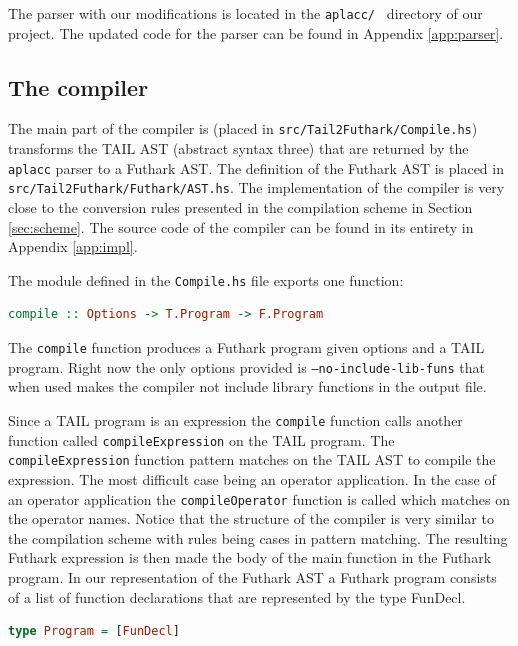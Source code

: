 \documentclass[11pt]{article}
\begin{document}
The parser with our modifications is located in the {\tt aplacc/ } directory of our project. 
The updated code for the parser can be found in Appendix \ref{app:parser}.

\subsection{The compiler}
The main part of the compiler is (placed in {\tt src/Tail2Futhark/Compile.hs}) transforms the TAIL AST (abstract syntax three) that are returned by the {\tt aplacc} parser to a Futhark AST.
The definition of the Futhark AST is placed in {\tt src/Tail2Futhark/Futhark/AST.hs}.
The implementation of the compiler is very close to the conversion rules presented in the compilation scheme in Section \ref{sec:scheme}. The source code of the compiler can be found in its entirety in Appendix \ref{app:impl}.

The module defined in the {\tt Compile.hs} file exports one function:
\begin{lstlisting}[language=haskell]
compile :: Options -> T.Program -> F.Program
\end{lstlisting}

The {\tt compile} function produces a Futhark program given options and a TAIL program. 
Right now the only options provided is {\tt --no-include-lib-funs} that when used makes the compiler not include library functions in the output file. 

Since a TAIL program is an expression the {\tt compile} function calls another function called {\tt compileExpression} on the TAIL program. The {\tt compileExpression} function pattern matches on the TAIL AST to compile the expression.
The most difficult case being an operator application. In the case of an operator application the {\tt compileOperator} function is called which matches on the operator names.
Notice that the structure of the compiler is very similar to the compilation scheme with rules being cases in pattern matching.
The resulting Futhark expression is then made the body of the main
function in the Futhark program. 
In our representation of the Futhark AST a Futhark program consists of a list of function declarations that are represented by the type FunDecl. 

\begin{lstlisting}[language=haskell]
type Program = [FunDecl]
\end{lstlisting}
\end{document}
